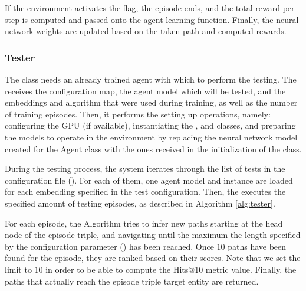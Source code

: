 If the environment activates the  flag, the episode ends, and the total reward per step is computed and passed onto the agent learning function. Finally, the neural network weights are updated based on the taken path and computed rewards.

\subsubsection{Tester}
The  class needs an already trained agent with which to perform the testing. The  receives the configuration map, the agent model which will be tested, and the embeddings and algorithm that were used during training, as well as the number of training episodes. Then, it performs the setting up operations, namely: configuring the GPU (if available), instantiating the ,  and  classes, and preparing the models to operate in the environment by replacing the neural network model created for the Agent class with the ones received in the initialization of the  class.

During the testing process, the system iterates through the list of tests in the configuration file (). For each of them, one agent model and  instance are loaded for each embedding specified in the test configuration. Then, the  executes the specified amount of testing episodes, as described in Algorithm \ref{alg:tester}. 


For each episode, the Algorithm tries to infer new paths starting at the head node of the episode triple, and navigating until the maximum the length specified by the configuration parameter () has been reached. Once $10$ paths have been found for the episode, they are ranked based on their scores. Note that we set the limit to $10$ in order to be able to compute the Hits@10 metric value. Finally, the paths that actually reach the episode triple target entity are returned. 



